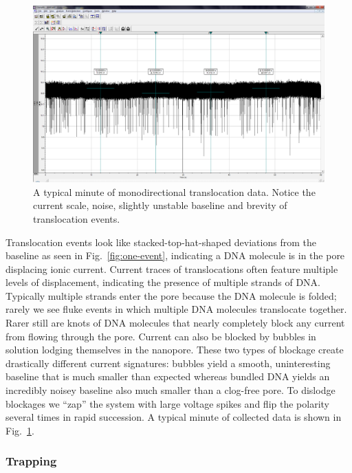 \documentclass[aps,prl,preprint,groupedaddress]{revtex4}
\begin{document}
\begin{figure}[h]
\centering
\includegraphics[width=1\textwidth]{figures/monodirectional-minute}
\caption{A typical minute of monodirectional translocation data.
Notice the current scale, noise, slightly unstable baseline and brevity of translocation events.}
\label{fig:trans-data}
\end{figure}

Translocation events look like stacked-top-hat-shaped deviations from the baseline as seen in Fig.~\ref{fig:one-event}, indicating a DNA molecule is in the pore displacing ionic current.
Current traces of translocations often feature multiple levels of displacement, indicating the presence of multiple strands of DNA.
Typically multiple strands enter the pore because the DNA molecule is folded; rarely we see fluke events in which multiple DNA molecules translocate together.
Rarer still are knots of DNA molecules that nearly completely block any current from flowing through the pore.
Current can also be blocked by bubbles in solution lodging themselves in the nanopore.
These two types of blockage create drastically different current signatures: bubbles yield a smooth, uninteresting baseline that is much smaller than expected whereas bundled DNA yields an incredibly noisey baseline also much smaller than a clog-free pore.
To dislodge blockages we ``zap'' the system with large voltage spikes and flip the polarity several times in rapid succession.
A typical minute of collected data is shown in Fig.~\ref{fig:trans-data}.

\subsubsection{Trapping}
\end{document}
